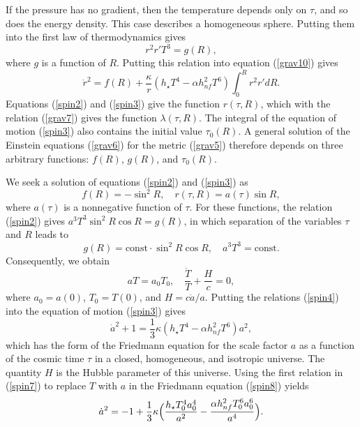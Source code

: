 \documentclass[prd,onecolumn,nofootinbib]{revtex4}
\begin{document}
If the pressure has no gradient, then the temperature depends only on $\tau$, and so does the energy density.
This case describes a homogeneous sphere.
Putting them into the first law of thermodynamics gives
\begin{equation}
    r^2 r'T^3=g(R),
    \label{spin2}
\end{equation}
where $g$ is a function of $R$.
Putting this relation into equation (\ref{grav10}) gives \cite{collapse}
\begin{equation}
    \dot{r}^2=f(R)+\frac{\kappa}{r}(h_\star T^4-\alpha h_{nf}^2 T^6)\int_0^R r^2 r'dR.
    \label{spin3}
\end{equation}
Equations (\ref{spin2}) and (\ref{spin3}) give the function $r(\tau,R)$, which with the relation (\ref{grav7}) gives the function $\lambda(\tau,R)$.
The integral of the equation of motion (\ref{spin3}) also contains the initial value $\tau_0(R)$.
A general solution of the Einstein equations (\ref{grav6}) for the metric (\ref{grav5}) therefore depends on three arbitrary functions: $f(R)$, $g(R)$, and $\tau_0(R)$.

We seek a solution of equations (\ref{spin2}) and (\ref{spin3}) as
\begin{equation}
    f(R)=-\sin^2 R,\quad r(\tau,R)=a(\tau)\sin R,
    \label{spin4}
\end{equation}
where $a(\tau)$ is a nonnegative function of $\tau$.
For these functions, the relation (\ref{spin2}) gives $a^3 T^3\sin^2 R\cos R=g(R)$, in which separation of the variables $\tau$ and $R$ leads to
\[
    g(R)=\mbox{const}\cdot \sin^2 R\cos R,\quad a^3 T^3=\mbox{const}.
\]
Consequently, we obtain
\begin{equation}
    aT=a_0 T_0,\quad \frac{\dot{T}}{T}+\frac{H}{c}=0,
    \label{spin7}
\end{equation}
where $a_0=a(0)$, $T_0=T(0)$, and $H=c\dot{a}/a$.
Putting the relations (\ref{spin4}) into the equation of motion (\ref{spin3}) gives \cite{collapse}
\begin{equation}
    \dot{a}^2+1=\frac{1}{3}\kappa(h_\star T^4-\alpha h_{nf}^2 T^6)a^2,
    \label{spin8}
\end{equation}
which has the form of the Friedmann equation for the scale factor $a$ as a function of the cosmic time $\tau$ in a closed, homogeneous, and isotropic universe.
The quantity $H$ is the Hubble parameter of this universe.
Using the first relation in (\ref{spin7}) to replace $T$ with $a$ in the Friedmann equation (\ref{spin8}) yields
\begin{equation}
    \dot{a}^2=-1+\frac{1}{3}\kappa\Bigl(\frac{h_\star T^4_0 a^4_0}{a^2}-\frac{\alpha h_{nf}^2 T_0^6 a^6_0}{a^4}\Bigr).
    \label{spin9}
\end{equation}
\end{document}
